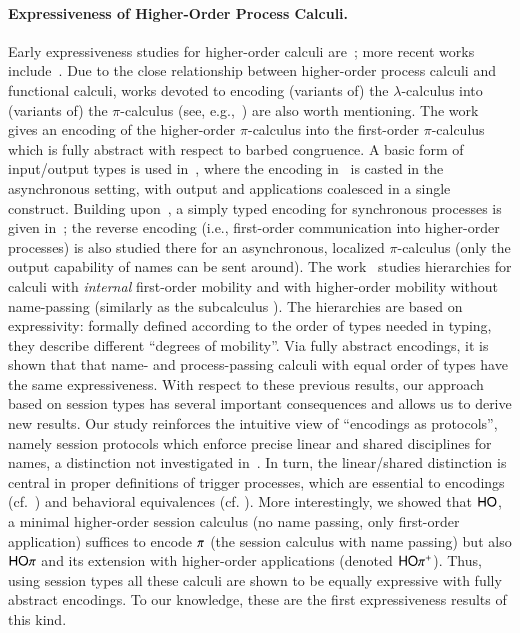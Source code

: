 \paragraph{Expressiveness of Higher-Order Process Calculi.}
Early expressiveness studies for higher-order calculi are~\cite{Tho90,San923}; 
more recent works include~\cite{BundgaardHG06,DBLP:conf/icalp/LanesePSS10,DBLP:journals/iandc/LanesePSS11,XuActa2012,DBLP:conf/wsfm/XuYL13}.
Due to the close relationship between higher-order process calculi and functional calculi, 
works devoted to encoding (variants of) the $\lambda$-calculus into (variants of) the $\pi$-calculus (see, e.g.,~\cite{San92,DBLP:journals/tcs/Fu99,DBLP:journals/iandc/YoshidaBH04,BHY,DBLP:conf/concur/SangiorgiX14}) are also worth mentioning.
The work~\cite{San923} gives an encoding of the higher-order $\pi$-calculus
into the first-order $\pi$-calculus which is fully abstract with respect to barbed congruence. 
A basic form of input/output types is used in~\cite{DBLP:journals/tcs/Sangiorgi01}, where the encoding in~\cite{San923} is casted in the asynchronous setting, with output and applications coalesced in a single construct. Building upon~\cite{DBLP:journals/tcs/Sangiorgi01}, 
a simply typed encoding for synchronous processes is given in~\cite{SaWabook}; the reverse encoding (i.e.,  first-order communication into higher-order processes) is also studied there for an asynchronous, localized $\pi$-calculus (only the output capability of names can be sent around).
The work~\cite{San96int} studies hierarchies for calculi with \emph{internal} first-order mobility and 
with higher-order mobility without name-passing (similarly as the subcalculus \HO). 
The hierarchies are based on expressivity: 
formally defined according to the order of types needed in typing, 
they describe different ``degrees of mobility''.
Via fully abstract encodings, it is shown that that name- and process-passing calculi with equal order of types have the same expressiveness.
With respect to these previous results, our approach based on session types 
has several important consequences and allows us to derive new results.  Our study reinforces the intuitive view of ``encodings as protocols'', namely session protocols which enforce precise linear and shared disciplines for names, a distinction not investigated in~\cite{San923,DBLP:journals/tcs/Sangiorgi01}. 
In turn, the linear/shared distinction is central in proper definitions of trigger processes, which are essential to encodings (cf.~) and behavioral equivalences (cf. ).
More interestingly, we showed that $\mathsf{HO}$, a  minimal higher-order session calculus (no name passing, only first-order application) suffices to encode $\pi$ (the session calculus with name passing) but also 
$\mathsf{HO}\pi$  and 
its extension  with higher-order applications (denoted $\mathsf{HO}\pi^{\mathsf +}$). 
Thus, using session types all these calculi are shown to be equally expressive with fully abstract encodings.
To our knowledge, these are the first expressiveness results of this kind.

